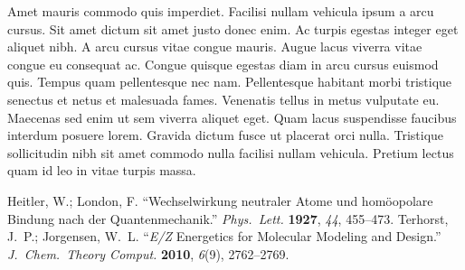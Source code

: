 \documentclass[letterpaper,\myfontsize]{article}
\newcommand*\mytref[7]{\bibitem{#1}#2 ``#3.'' \textit{#4} \textbf{#5}, \textit{#6}, #7.} %
\newcommand*\myzref[8]{\bibitem{#1}#2 ``#3.'' \textit{#4} \textbf{#5}, \textit{#6}(#7), #8.} %
\begin{document}
Amet mauris commodo quis imperdiet. Facilisi nullam vehicula ipsum a arcu cursus. Sit amet dictum sit amet justo donec enim. Ac turpis egestas integer eget aliquet nibh. A arcu cursus vitae congue mauris. Augue lacus viverra vitae congue eu consequat ac. Congue quisque egestas diam in arcu cursus euismod quis. Tempus quam pellentesque nec nam. Pellentesque habitant morbi tristique senectus et netus et malesuada fames. Venenatis tellus in metus vulputate eu. Maecenas sed enim ut sem viverra aliquet eget. Quam lacus suspendisse faucibus interdum posuere lorem. Gravida dictum fusce ut placerat orci nulla. Tristique sollicitudin nibh sit amet commodo nulla facilisi nullam vehicula. Pretium lectus quam id leo in vitae turpis massa.












\newpage
{}

\begin{thebibliography}{200}
\mytref{heitlon}{Heitler, W.; London, F.}{Wechselwirkung neutraler Atome und hom\"oopolare Bindung nach der Quantenmechanik}{Phys.\ Lett.}{1927}{44}{455--473}
\myzref{ez}{Terhorst, J.\ P.; Jorgensen, W.\ L.}{\textsl{E/Z} Energetics for Molecular Modeling and Design}{J.\ Chem.\ Theory Comput.}{2010}{6}{9}{2762--2769}
\end{thebibliography}

\end{document}
